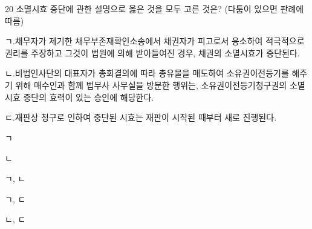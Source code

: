 \begin{question}{20}
소멸시효 중단에 관한 설명으로 옳은 것을 모두 고른 것은? (다툼이 있으면 판례에 따름)
\begin{framedtext}
ㄱ.채무자가 제기한 채무부존재확인소송에서 채권자가 피고로서 응소하여 적극적으로 권리를 주장하고 그것이 법원에 의해 받아들여진 경우, 채권의 소멸시효가 중단된다. \par
ㄴ.비법인사단의 대표자가 총회결의에 따라 총유물을 매도하여 소유권이전등기를 해주기 위해 매수인과 함께 법무사 사무실을 방문한 행위는, 소유권이전등기청구권의 소멸시효 중단의 효력이 있는 승인에 해당한다. \par
ㄷ.재판상 청구로 인하여 중단된 시효는 재판이 시작된 때부터 새로 진행된다.
\end{framedtext}
\begin{choices}
  \item ㄱ
  \item ㄴ
  \item ㄱ, ㄴ
  \item ㄱ, ㄷ
  \item ㄴ, ㄷ
\end{choices}
\end{question}
